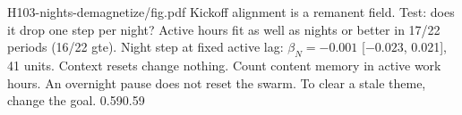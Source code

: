 {H103-nights-demagnetize/fig.pdf}
{Kickoff alignment is a remanent field. Test: does it drop one step per night?}
{Active hours fit as well as nights or better in 17/22 periods (16/22 gte). Night step at fixed active lag: $\beta_N=-0.001$ [$-0.023$, 0.021], 41 units. Context resets change nothing.}
{Count content memory in active work hours. An overnight pause does not reset the swarm. To clear a stale theme, change the goal.}
{0.59}{0.59}
